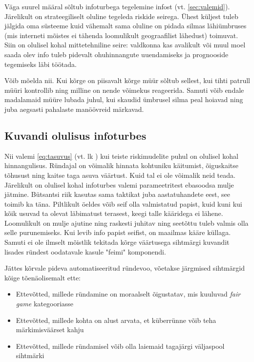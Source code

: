 \documentclass{article}
\begin{document}
Väga suurel määral sõltub infoturbega tegelemine infost (vt. \ref{sec:valemid}). Järelikult on strateegiliselt oluline tegeleda riskide seirega. Ühest küljest tuleb jälgida oma süsteeme kuid vähemalt sama oluline on pidada silmas lähiümbruses (mis interneti mõistes ei tähenda loomulikult geograafilist lähedust) toimuvat. Siin on olulisel kohal mittetehniline seire: valdkonna kas avalikult või muul moel saada olev info tuleb pidevalt ohuhinnangute uuendamiseks ja prognooside tegemiseks läbi töötada. 

Võib mõelda nii. Kui kõrge on piisavalt kõrge müür sõltub sellest, kui tihti patrull müüri kontrollib ning milline on nende võimekus reageerida. Samuti võib endale madalamaid müüre lubada juhul, kui skaudid ümbrusel silma peal hoiavad ning juba aegsasti pahalaste manöövreid märkavad. 

\subsection{Kuvandi olulisus infoturbes}
Nii valemi \ref{eq:tasuvus} (vt. lk \pageref{eq:tasuvus}) kui teiste riskimudelite puhul on olulisel kohal hinnangulisus. Ründajal on võimalik hinnata kohtuniku käitumist, õiguskaitse tõhusust ning kaitse taga asuva väärtust. Kuid tal ei ole võimalik neid teada. Järelikult on olulisel kohal infoturbes valemi parameetritest ebasoodsa mulje jätmine. Bütsantsi riik kasutas sama taktikat juba aastatuhandete eest, see toimib ka täna. Piltlikult öeldes võib seif olla valmistatud papist, kuid kuni kui kõik usuvad ta olevat läbimatust terasest, keegi talle kääridega ei lähene. Loomulikult on mulje ajutine ning raskesti juhitav ning seetõttu tuleb valmis olla selle purunemiseks. Kui levib info papist seifist, on maailmas kääre küllaga. Samuti ei ole ilmselt mõistlik tekitada kõrge väärtusega sihtmärgi kuvandit lisades ründest oodatavale kasule "feimi" komponendi. 

Jättes kõrvale pideva automatiseeritud ründevoo, võetakse järgmised sihtmärgid kõige tõenäolisemalt ette:
\begin{itemize}
	\item Ettevõtted, millede ründamine on moraalselt õigustatav, mis kuuluvad \emph{fair game} kategooriasse
	\item Ettevõtted, millede kohta on alust arvata, et küberrünne võib teha märkimisväärset kahju
	\item Ettevõtted, millede ründamisel võib olla laiemaid tagajärgi väljaspool sihtmärki
\end{itemize}
\end{document}
